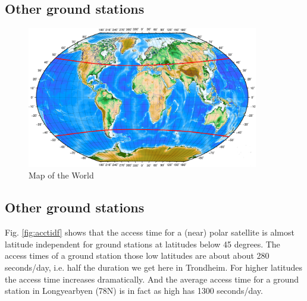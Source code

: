 \subsection{Other ground stations}
\begin{figure}
  \begin{center}
    \includegraphics[width=0.9\textwidth]{Figures/verdenskart}
  \end{center}
  \caption[world]{Map of the World}
  \label{fig:world}
\end{figure}

\subsection{Other ground stations}
Fig. \ref{fig:acctidf} shows that the access time for a (near) polar satellite is almost latitude independent for ground stations at latitudes below 45 degrees. The access times of a ground station those low latitudes are about about 280 seconds/day, i.e. half the duration we get here in Trondheim. For higher latitudes the access time increases dramatically. And the average access time for a ground station in Longyearbyen (78N) is in fact as high has 1300 seconds/day.
